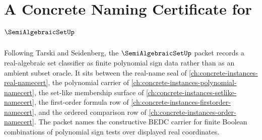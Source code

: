 \chapter{A Concrete Naming Certificate for $\SemiAlgebraicSetUp$}
\label{ch:concrete-instances-semi-algebraic-set-namecert}

Following Tarski and Seidenberg, the $\SemiAlgebraicSetUp$ packet records a real-algebraic set classifier as finite polynomial sign data rather than as an ambient subset oracle. It sits between the real-name seal of \autoref{ch:concrete-instances-real-namecert}, the polynomial carrier of \autoref{ch:concrete-instances-polynomial-namecert}, the set-like membership surface of \autoref{ch:concrete-instances-setlike-namecert}, the first-order formula row of \autoref{ch:concrete-instances-firstorder-namecert}, and the ordered comparison row of \autoref{ch:concrete-instances-order-namecert}. The packet names the constructive BEDC carrier for finite Boolean combinations of polynomial sign tests over displayed real coordinates.


